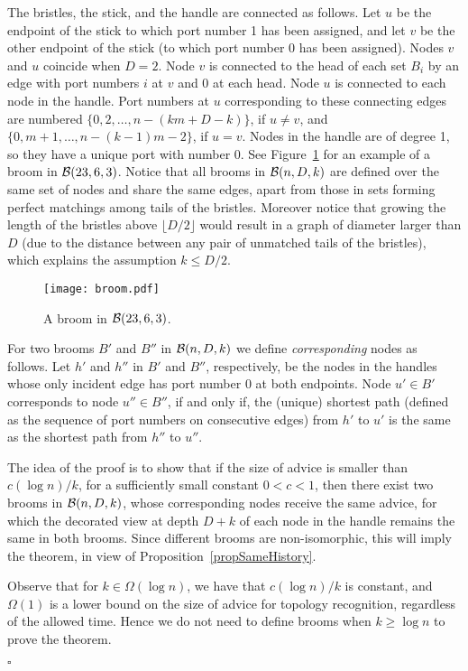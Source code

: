 \documentclass{article}
\newcommand{\cB}{{\cal B}}
\newcommand*{\qed}{\hfill\ensuremath{\square}}
\newenvironment{proof}{\noindent{\bf Proof:}}{\qed}
\begin{document}
\begin{proof}
The bristles, the stick, and the handle are connected as follows.
Let $u$ be the endpoint of the stick to which port number 1 has been assigned, and let $v$ be the other endpoint of the stick (to which port number 0 has been assigned). Nodes $v$ and $u$ coincide when $D=2$.
Node $v$ is connected to the head of each set $B_i$ by an edge with port numbers $i$ at $v$ and 0 at each head.
Node $u$ is connected to each node in the handle. Port numbers at $u$ corresponding to these connecting edges are numbered $\{0, 2, \dots, n - (km + D - k) \}$, if $u\neq v$, and 
$\{0, m+1, \dots, n - (k-1) m -2 \}$, if $u=v$. Nodes in the handle are of degree 1, so they have a unique port with number 0. See Figure~\ref{fig.fan} for an example of a broom in $\cB(23,6,3)$.
Notice that all brooms in $\cB(n,D,k)$ are defined over the same set of nodes and share the same edges, apart from those in sets forming perfect matchings among tails of the bristles. Moreover notice that growing the length of the bristles above $\lfloor D/2\rfloor$ would result in a graph of diameter larger than $D$ {(due to the distance between any pair of unmatched tails of the bristles)}, which explains the assumption $k\le D/2$.

\begin{figure}
\centering
\texttt{[image: broom.pdf]}
\caption{\label{fig.fan} A broom in $\cB(23, 6,3)$.}
\end{figure}

For two brooms $B'$ and $B''$ in $\cB(n,D,k)$ we define {\em corresponding} nodes as follows. Let $h'$ and $h''$ in $B'$ and $B''$, respectively, be the nodes in the handles whose only incident edge has port number 0 at both endpoints.
Node {$u'\in B'$} corresponds to node {$u''\in B''$}, if and only if, the (unique) shortest path (defined as the sequence of  port numbers on consecutive edges) from $h'$ to $u'$ is the same as the shortest path from $h''$ to $u''$.

The idea of the proof is to show that if the size of advice is smaller than $c (\log n) / k$, for a sufficiently small constant $0<c<1$, then there exist two brooms in $\cB(n,D,k)$, whose corresponding nodes receive the same advice, for which the decorated view at depth $D+k$ of each node in the handle remains the same in both brooms. 
Since different brooms are non-isomorphic, this will imply the theorem, in view of Proposition~\ref{propSameHistory}.

Observe that for $k \in  \Omega(\log n)$, we have that $c(\log n) / k$ is constant, and  $\Omega(1)$ is a lower bound on the size of advice for topology recognition, regardless of the allowed time.
Hence we do not need to define brooms when $k \ge \log n$ to prove the theorem.



\end{proof}
\end{document}
